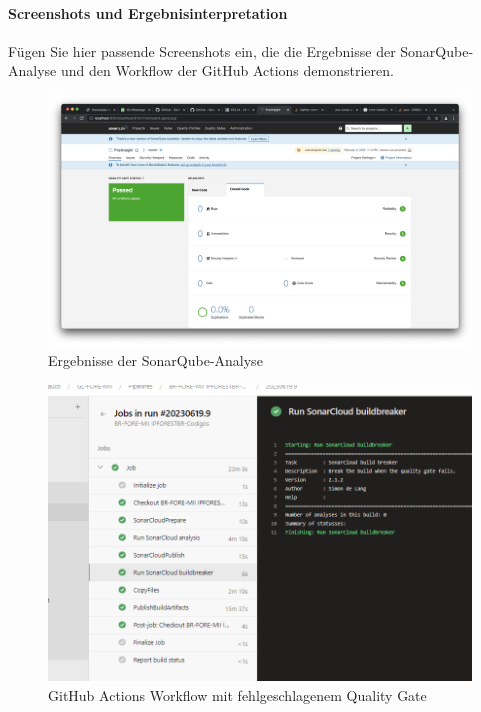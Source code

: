 \paragraph{Screenshots und Ergebnisinterpretation}

Fügen Sie hier passende Screenshots ein, die die Ergebnisse der SonarQube-Analyse und den Workflow der GitHub Actions demonstrieren.

\begin{figure}[h!]
\centering
\includegraphics[width=\textwidth]{img/sonarqube_results.jpeg}
\caption{Ergebnisse der SonarQube-Analyse}
\label{fig:sonarqube_results}
\end{figure}

\begin{figure}[h!]
\centering
\includegraphics[width=\textwidth]{img/github_actions_failed_quality_gate.png}
\caption{GitHub Actions Workflow mit fehlgeschlagenem Quality Gate}
\label{fig:github_actions_failed_quality_gate}
\end{figure}

